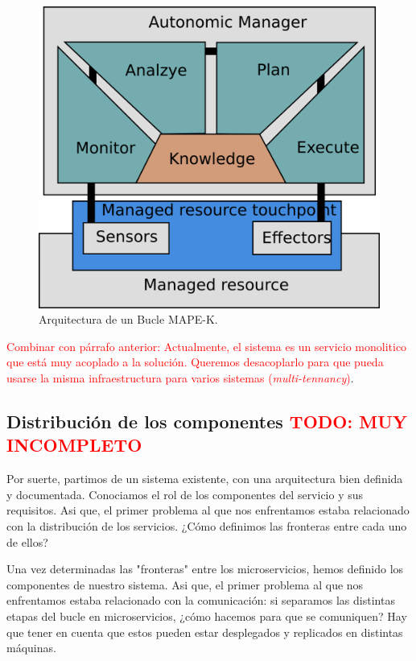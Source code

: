\begin{figure}[h]
  \centering
  \includegraphics[scale=0.6]{01_introduccion/images/bucle-mape-k.png}
  \caption[Arquitectura de un Bucle MAPE-K.]{Arquitectura de un Bucle MAPE-K.\footnotemark}
  \label{fig:bucle-mapek2}
\end{figure}


\textcolor{red}{Combinar con párrafo anterior: Actualmente, el sistema es un servicio monolitico que está muy acoplado a la solución. Queremos desacoplarlo para que pueda usarse la misma infraestructura para varios sistemas (\textit{multi-tennancy})}.

\subsection{Distribución de los componentes \textcolor{red}{TODO: MUY INCOMPLETO}}

Por suerte, partimos de un sistema existente, con una arquitectura bien definida y documentada. Conociamos el rol de los componentes del servicio y sus requisitos. Asi que, el primer problema al que nos enfrentamos estaba relacionado con la distribución de los servicios. ¿Cómo definimos las fronteras entre cada uno de ellos?

Una vez determinadas las "fronteras" entre los microservicios, hemos definido los componentes de nuestro sistema. Asi que, el primer problema al que nos enfrentamos estaba relacionado con la comunicación: si separamos las distintas etapas del bucle en microservicios, ¿cómo hacemos para que se comuniquen? Hay que tener en cuenta que estos pueden estar desplegados y replicados en distintas máquinas.

